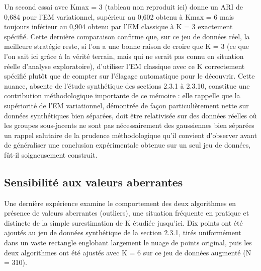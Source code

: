 Un second essai avec Kmax = 3 (tableau non reproduit ici) donne un ARI de 0,684 pour l'EM variationnel, supérieur au 0,602 obtenu à Kmax = 6 mais toujours inférieur au 0,904 obtenu par l'EM classique à K = 3 exactement spécifié. Cette dernière comparaison confirme que, sur ce jeu de données réel, la meilleure stratégie reste, si l'on a une bonne raison de croire que K = 3 (ce que l'on sait ici grâce à la vérité terrain, mais qui ne serait pas connu en situation réelle d'analyse exploratoire), d'utiliser l'EM classique avec ce K correctement spécifié plutôt que de compter sur l'élagage automatique pour le découvrir. Cette nuance, absente de l'étude synthétique des sections 2.3.1 à 2.3.10, constitue une contribution méthodologique importante de ce mémoire : elle rappelle que la supériorité de l'EM variationnel, démontrée de façon particulièrement nette sur données synthétiques bien séparées, doit être relativisée sur des données réelles où les groupes sous-jacents ne sont pas nécessairement des gaussiennes bien séparées  un rappel salutaire de la prudence méthodologique qu'il convient d'observer avant de généraliser une conclusion expérimentale obtenue sur un seul jeu de données, fût-il soigneusement construit.

\subsection{Sensibilité aux valeurs aberrantes}
Une dernière expérience examine le comportement des deux algorithmes en présence de valeurs aberrantes (outliers), une situation fréquente en pratique et distincte de la simple surestimation de K étudiée jusqu'ici. Dix points ont été ajoutés au jeu de données synthétique de la section 2.3.1, tirés uniformément dans un vaste rectangle englobant largement le nuage de points original, puis les deux algorithmes ont été ajustés avec K = 6 sur ce jeu de données augmenté (N = 310).

